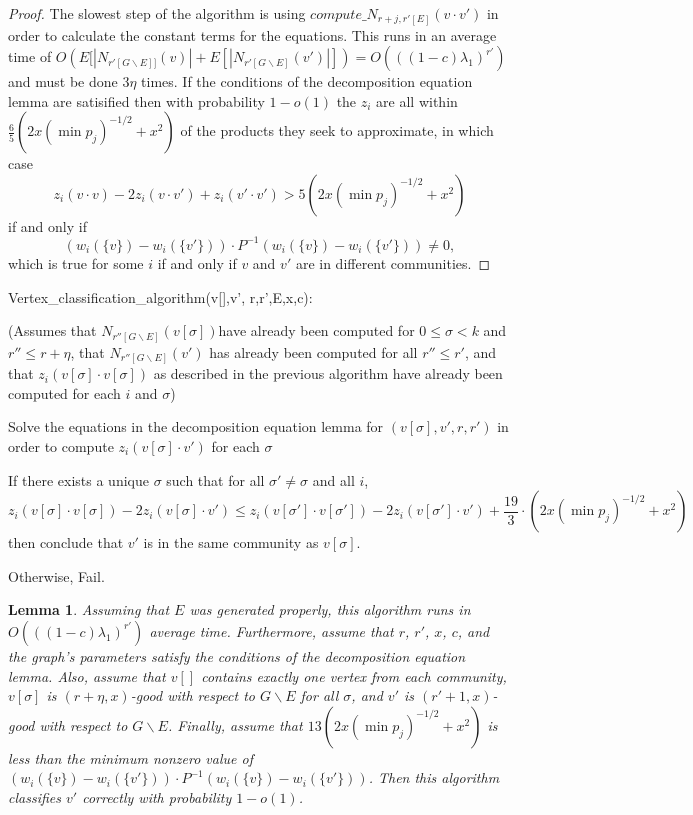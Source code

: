 \documentclass[11pt]{article}
\newcommand{\1}{\mathbb{1}}
\newtheorem{lemma}{Lemma}
\begin{document}
\begin{proof}
The slowest step of the algorithm is using $compute\_N_{r+j,r'[E]}(v\cdot v')$ in order to calculate the constant terms for the equations. This runs in an average time of $O(E[|N_{r'[G\backslash E]]}(v)|+E[|N_{r'[G\backslash E]}(v')|])= O(((1-c)\lambda_1)^{r'})$ and must be done $3\eta$ times. If the conditions of the decomposition equation lemma are satisified then with probability $1-o(1)$ the $z_i$ are all within $\frac{6}{5}(2x(\min p_j)^{-1/2}+x^2)$ of the products they seek to approximate, in which case $$z_i(v\cdot v)-2z_i(v\cdot v')+z_i(v'\cdot v')> 5(2x(\min p_j)^{-1/2}+x^2)$$ if and only if $$(w_i(\{v\})- w_i(\{v'\}))\cdot P^{-1}(w_i(\{v\})- w_i(\{v'\}))\ne 0,$$ which is true for some $i$ if and only if $v$ and $v'$ are in different communities.
\end{proof}

\begin{algorithm}
Vertex\_classification\_algorithm(v[],v', r,r',E,x,c):

(Assumes that $N_{r''[G\backslash E]}(v[\sigma])$have already been computed for $0\le \sigma<k$ and $r''\le r+\eta$, that $N_{r''[G\backslash E]}(v')$ has already been computed for all $r''\le r'$, and that $z_i(v[\sigma]\cdot v[\sigma] )$ as described in the previous algorithm have already been computed for each $i$ and $\sigma$)

\phantom{xxx} Solve the equations in the decomposition equation lemma for $(v[\sigma],v',r,r')$ in order to compute $z_i(v[\sigma]\cdot v')$ for each $\sigma$

\phantom{xxx} If there exists a unique $\sigma$ such that for all $\sigma'\ne \sigma$ and all $i$, \[z_i(v[\sigma]\cdot v[\sigma])-2z_i(v[\sigma]\cdot v')\le z_i(v[\sigma']\cdot v[\sigma'])-2z_i(v[\sigma']\cdot v') +\frac{19}{3}\cdot (2x(\min p_j)^{-1/2}+x^2)\] then conclude that $v'$ is in the same community as $v[\sigma]$.

\phantom{xxx} Otherwise, Fail.
\end{algorithm}

\begin{lemma}
Assuming that $E$ was generated properly, this algorithm runs in $O(((1-c)\lambda_1)^{r'})$ average time. Furthermore, assume that $r$, $r'$, $x$, $c$, and the graph's parameters satisfy the conditions of the decomposition equation lemma. Also, assume that $v[]$ contains exactly one vertex from each community, $v[\sigma]$ is $( r+\eta,x)$-good with respect to $G\backslash E$ for all $\sigma$, and $v'$ is $(r'+1,x)$-good with respect to $G\backslash E$. Finally, assume that $13(2x(\min p_j)^{-1/2}+x^2)$ is less than the minimum nonzero value of $(w_i(\{v\})- w_i(\{v'\}))\cdot P^{-1}(w_i(\{v\})- w_i(\{v'\}))$. Then this algorithm classifies $v'$ correctly with probability $1-o(1)$.
\end{lemma}
\end{document}

